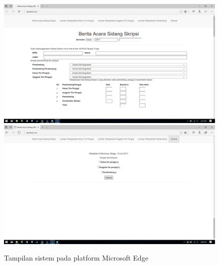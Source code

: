 \begin{figure}[H]
	\centering
	\includegraphics[scale=0.4]{Gambar/MsEdge}
	\includegraphics[scale=0.4]{Gambar/MsEdgeSelesai}
	\caption{Tampilan sistem pada platform Microsoft Edge}
	\label{fig:MsEdge}
\end{figure}

